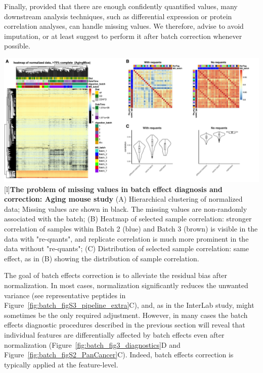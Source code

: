 \documentclass[num-refs]{wiley-article}
\begin{document}
{\begin{tcolorbox}
		Finally, provided that there are enough confidently quantified values, many downstream analysis techniques, such as differential expression or protein correlation analyses, can handle missing values. We therefore, advise to avoid imputation, or at least suggest to perform it after batch correction whenever possible. 

		
		\begin{minipage}[h]{\linewidth}
			\includegraphics[width=.9\textwidth]{figures/Fig4_missing_values.pdf}
			[l]{\textbf{The problem of missing values in batch effect diagnosis and correction: Aging mouse study} }
			\label{fig:batch_fig4_missing_values}
			{\footnotesize  (A) Hierarchical clustering of normalized data; Missing values are shown in black. The missing values are non-randomly associated with the batch; (B) Heatmap of selected sample correlation: stronger correlation of samples within Batch 2 (blue) and Batch 3 (brown) is visible in the data with "re-quants", and replicate correlation is much more prominent in the data without "re-quants";	(C) Distribution of selected sample correlation: same effect, as in (B) showing the distribution of sample correlation.}
		\end{minipage}
	\end{tcolorbox}
	\clearpage
}

The goal of batch effects correction is to alleviate the residual bias after normalization. In most cases, normalization significantly reduces the unwanted variance (see representative peptides in Figure~\ref{fig:batch_figS3_pipeline_extra}C), and, as in the InterLab study, might sometimes be the only required adjustment. However, in many cases the batch effects diagnostic procedures described in the previous section will reveal that individual features are differentially affected by batch effects even after normalization (Figure~\ref{fig:batch_fig3_diagnostics}D and Figure~\ref{fig:batch_figS2_PanCancer}C). Indeed, batch effects correction is typically applied at the feature-level.
\end{document}
